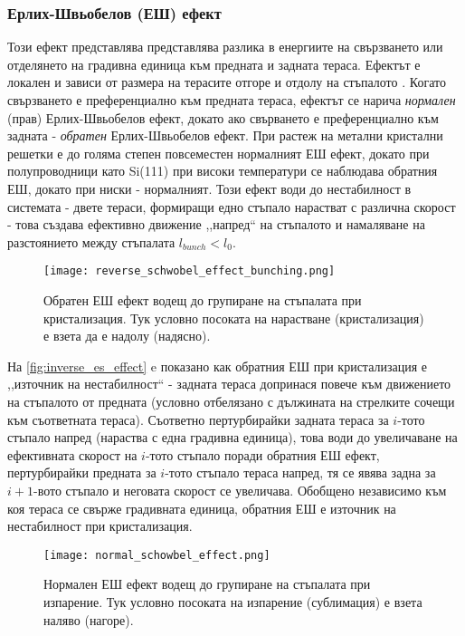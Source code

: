 \subsubsection{Ерлих-Швьобелов (ЕШ) ефект}
Този ефект представлява представлява разлика в енергиите на свързването или отделянето на градивна единица към предната и задната тераса. Ефектът е локален и зависи от размера на терасите
отгоре и отдолу на стъпалото \cite{Krug2005}. Когато свързването е преференциално към предната тераса, ефектът се нарича \textit{нормален} (прав) Ерлих-Швьобелов ефект,  докато ако свърването е преференциално към задната - \textit{обратен} Ерлих-Швьобелов ефект. При растеж на метални кристални решетки е до голяма степен повсеместен нормалният ЕШ ефект, докато при полупроводници като Si(111) при високи температури се наблюдава обратния ЕШ, докато при ниски - нормалният.
Този ефект води до нестабилност в системата - двете тераси, формиращи едно стъпало нарастват с различна скорост - това създава ефективно движение ,,напред`` на стъпалото и намаляване на разстоянието между стъпалата $l_{bunch} < l_0$.
\begin{figure}[htbp]
	\centering
	\texttt{[image: reverse\_schwobel\_effect\_bunching.png]}
	\caption{Обратен ЕШ ефект водещ до групиране на стъпалата при кристализация. Тук условно посоката на нарастване (кристализация) е взета да е надолу (надясно).}
	\label{fig:inverse_es_effect}
\end{figure}

На \autoref{fig:inverse_es_effect} e показано как обратния ЕШ при кристализация е ,,източник на нестабилност`` - задната тераса допринася повече към движението на стъпалото от предната (условно отбелязано с дължината на стрелките сочещи към съответната тераса). Съответно пертурбирайки задната тераса за $i$-тото стъпало напред (нараства с една градивна единица), това води до увеличаване на ефективната скорост на $i$-тото стъпало поради обратния ЕШ ефект, пертурбирайки предната за $i$-тото стъпало тераса напред, тя се явява задна за $i+1$-вото стъпало и неговата скорост се увеличава. Обобщено независимо към коя тераса се свърже градивната единица, обратния ЕШ е източник на нестабилност при кристализация.
\begin{figure}[htbp]
	\centering
	\texttt{[image: normal\_schowbel\_effect.png]}
	\caption{Нормален ЕШ ефект водещ до групиране на стъпалата при изпарение. Тук условно посоката на изпарение (сублимация) е взета наляво (нагоре).}
	\label{fig:normal_es_effect}
\end{figure}

